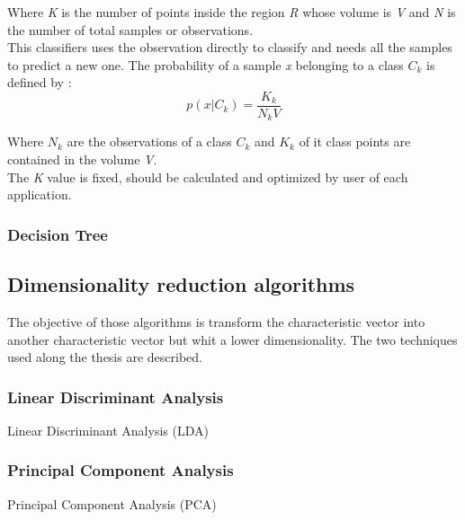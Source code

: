 Where \textit{K} is the number of points inside the region \textit{R} whose volume is \textit{V} and \textit{N} is the number of total samples or observations.\\

This classifiers uses the observation directly to classify and needs all the samples to predict a new one. The probability of a sample \textit{x} belonging to a class \textit{$C_k$} is defined by \cite{MachineLearning}:
\begin{equation}
p(x|C_k) = \frac{K_k}{N_k V}
\end{equation}

Where $N_k$ are the observations of a class $C_k$ and $K_k$ of it class points are contained in the volume \textit{V}.\\

The \textit{K} value is fixed, should be calculated and optimized by user of each application.\\

\subsubsection{Decision Tree}

\subsection{Dimensionality reduction algorithms}
The objective of those algorithms is transform the characteristic vector into another characteristic vector but whit a lower dimensionality. The two techniques used along the thesis are described.
\subsubsection{Linear Discriminant Analysis}
Linear Discriminant Analysis (LDA)

\subsubsection{Principal Component Analysis}
Principal Component Analysis (PCA)

